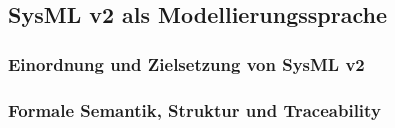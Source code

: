 \subsection{SysML v2 als Modellierungssprache}
\label{sec:sysml_v2_foundation}

\subsubsection{Einordnung und Zielsetzung von SysML v2}
\label{sec:sysml_v2_scope}

%
%
%
%
%
%
%
%
%


\subsubsection{Formale Semantik, Struktur und Traceability}
\label{sec:sysml_v2_semantics}

%
%
%
%
%
%
%


